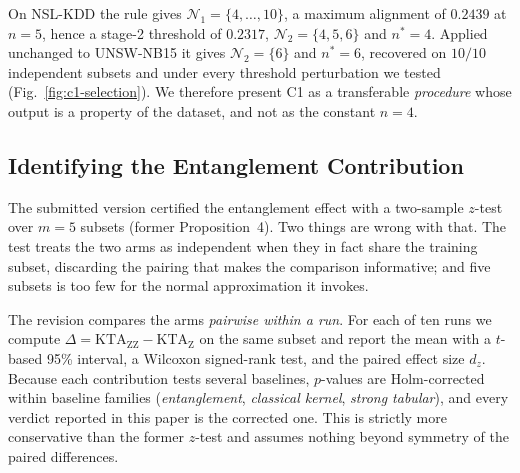 \begin{revbody}
On NSL-KDD the rule gives $\mathcal{N}_1=\{4,\dots,10\}$, a maximum alignment of
$0.2439$ at $n=5$, hence a stage-2 threshold of $0.2317$, $\mathcal{N}_2=\{4,5,6\}$
and $n^{\ast}=4$. Applied unchanged to UNSW-NB15 it gives $\mathcal{N}_2=\{6\}$
and $n^{\ast}=6$, recovered on $10/10$ independent subsets and under every
threshold perturbation we tested (Fig.~\ref{fig:c1-selection}). We therefore
present C1 as a transferable \emph{procedure} whose output is a property of the
dataset, and not as the constant $n=4$.
\end{revbody}

\subsection{Identifying the Entanglement Contribution}
\begin{revbody}

The submitted version certified the entanglement effect with a two-sample
$z$-test over $m=5$ subsets (former Proposition~4). Two things are wrong with
that. The test treats the two arms as independent when they in fact share the
training subset, discarding the pairing that makes the comparison informative;
and five subsets is too few for the normal approximation it invokes.

The revision compares the arms \emph{pairwise within a run}. For each of ten runs
we compute
$\Delta = \mathrm{KTA}_{\mathrm{ZZ}} - \mathrm{KTA}_{\mathrm{Z}}$ on the same
subset and report the mean with a $t$-based 95\% interval, a Wilcoxon
signed-rank test, and the paired effect size $d_z$. Because each contribution
tests several baselines, $p$-values are Holm-corrected within baseline families
(\emph{entanglement}, \emph{classical kernel}, \emph{strong tabular}), and every
verdict reported in this paper is the corrected one. This is strictly more
conservative than the former $z$-test and assumes nothing beyond symmetry of the
paired differences.
\end{revbody}

